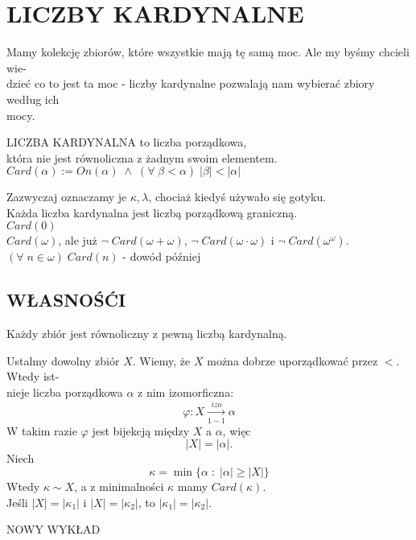 \section{LICZBY KARDYNALNE}
Mamy kolekcję zbiorów, które wszystkie mają tę samą moc. Ale my byśmy chcieli wie-\\dzieć co to jest ta moc - liczby kardynalne pozwalają nam wybierać zbiory według ich \\mocy.\bigskip
\begin{center}\large
    {\color{def}LICZBA KARDYNALNA} to liczba porządkowa, \\która nie jest równoliczna z żadnym swoim elementem.\smallskip\\
    $Card(\alpha):=On(\alpha)\;\land\;(\forall\;\beta<\alpha)\;|\beta|<|\alpha|$
\end{center}\medskip
Zazwyczaj oznaczamy je $\kappa, \lambda$, chociaż kiedyś używało się gotyku.\bigskip\\
{\large\color{acc}Każda liczba kardynalna jest liczbą porządkową graniczną.}\medskip\\
$Card(0)$\smallskip\\
$Card(\omega)$, ale już $\neg\;Card(\omega+\omega)$, $\neg\;Card(\omega\cdot\omega)$ i $\neg\;Card(\omega^\omega)$.\smallskip\\
$(\forall\;n\in\omega)\;Card(n)$ - dowód później


\subsection{WŁASNOŚĆI}
\begin{center}\large
    Każdy zbiór jest równoliczny z pewną liczbą kardynalną.
\end{center}
\dowod
Ustalmy dowolny zbiór $X$. Wiemy, że $X$ można dobrze uporządkować przez $<$. Wtedy ist-\\nieje liczba porządkowa $\alpha$ z nim izomorficzna:
$$\varphi:X\xrightarrow[1-1]{izo}\alpha$$
W takim razie $\varphi$ jest bijekcją między $X$ a $\alpha$, więc
$$|X|=|\alpha|.$$
Niech
$$\kappa=\min\{\alpha\;:\;|\alpha|\geq|X|\}$$
Wtedy $\kappa\sim X$, a z minimalności $\kappa$ mamy $Card(\kappa)$.\medskip\\
Jeśli $|X|=|\kappa_1|$ i $|X|=|\kappa_2|$, to $|\kappa_1|=|\kappa_2|$.


NOWY WYKŁAD


